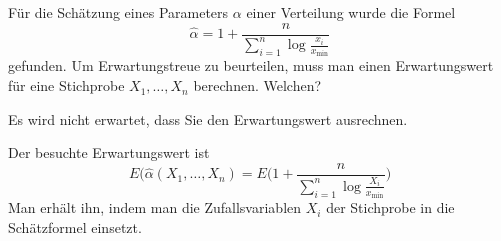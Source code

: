 Für die Schätzung eines Parameters $\alpha$ einer Verteilung
wurde die Formel
\[
\hat{\alpha}
=
1
+
\frac{n}{\sum_{i=1}^n \log\frac{x_i}{x_{\text{min}}}}
\]
gefunden.
Um Erwartungstreue zu beurteilen, muss man einen Erwartungswert
für eine Stichprobe $X_1,\dots,X_n$
berechnen.
Welchen?

\begin{hinweis}
Es wird nicht erwartet, dass Sie den Erwartungswert ausrechnen.
\end{hinweis}

\begin{loesung}
Der besuchte Erwartungswert ist
\[
E(\hat{\alpha}(X_1,\dots,X_n)
=
E\biggl(
1
+
\frac{n}{\sum_{i=1}^n \log\frac{X_i}{x_{\text{min}}}}
\biggr)
\]
Man erhält ihn, indem man die Zufallsvariablen $X_i$ der Stichprobe
in die Schätzformel einsetzt.
\end{loesung}

